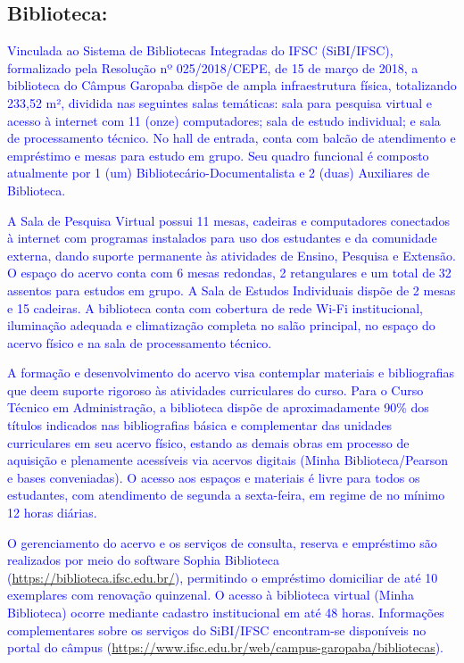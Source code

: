 \documentclass{../../modelos/latex-shared/ifsc-ppc}
\newcommand{\revisao}[1]{\textcolor{blue}{#1}}
\newcommand{\revisao}[1]{#1}
\begin{document}
\subsection{Biblioteca:}
\revisao{Vinculada ao Sistema de Bibliotecas Integradas do IFSC (SiBI/IFSC), formalizado pela Resolução nº 025/2018/CEPE, de 15 de março de 2018, a biblioteca do Câmpus Garopaba dispõe de ampla infraestrutura física, totalizando 233,52 m², dividida nas seguintes salas temáticas: sala para pesquisa virtual e acesso à internet com 11 (onze) computadores; sala de estudo individual; e sala de processamento técnico. No hall de entrada, conta com balcão de atendimento e empréstimo e mesas para estudo em grupo. Seu quadro funcional é composto atualmente por 1 (um) Bibliotecário-Documentalista e 2 (duas) Auxiliares de Biblioteca.}

\revisao{A Sala de Pesquisa Virtual possui 11 mesas, cadeiras e computadores conectados à internet com programas instalados para uso dos estudantes e da comunidade externa, dando suporte permanente às atividades de Ensino, Pesquisa e Extensão. O espaço do acervo conta com 6 mesas redondas, 2 retangulares e um total de 32 assentos para estudos em grupo. A Sala de Estudos Individuais dispõe de 2 mesas e 15 cadeiras. A biblioteca conta com cobertura de rede Wi-Fi institucional, iluminação adequada e climatização completa no salão principal, no espaço do acervo físico e na sala de processamento técnico.}

\revisao{A formação e desenvolvimento do acervo visa contemplar materiais e bibliografias que deem suporte rigoroso às atividades curriculares do curso. Para o Curso Técnico em Administração, a biblioteca dispõe de aproximadamente 90\% dos títulos indicados nas bibliografias básica e complementar das unidades curriculares em seu acervo físico, estando as demais obras em processo de aquisição e plenamente acessíveis via acervos digitais (Minha Biblioteca/Pearson e bases conveniadas). O acesso aos espaços e materiais é livre para todos os estudantes, com atendimento de segunda a sexta-feira, em regime de no mínimo 12 horas diárias.}

\revisao{O gerenciamento do acervo e os serviços de consulta, reserva e empréstimo são realizados por meio do software Sophia Biblioteca (\url{https://biblioteca.ifsc.edu.br/}), permitindo o empréstimo domiciliar de até 10 exemplares com renovação quinzenal. O acesso à biblioteca virtual (Minha Biblioteca) ocorre mediante cadastro institucional em até 48 horas. Informações complementares sobre os serviços do SiBI/IFSC encontram-se disponíveis no portal do câmpus (\url{https://www.ifsc.edu.br/web/campus-garopaba/bibliotecas}).}
\end{document}
